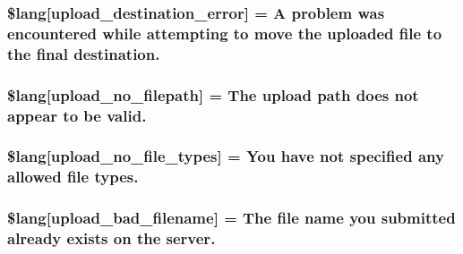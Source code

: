 \subsubsection[{\$lang}]{\setlength{\rightskip}{0pt plus 5cm}\$lang\mbox{[}\textquotesingle{}upload\+\_\+destination\+\_\+error\textquotesingle{}\mbox{]} = \textquotesingle{}A problem was encountered while attempting to move the uploaded file to the final destination.\textquotesingle{}}\label{system_2language_2english_2upload__lang_8php_a31be70c748b9bfc43dd7468e1fa64c42}
\hypertarget{system_2language_2english_2upload__lang_8php_a3c17908c53072c6a5ef593760aaaa704}{}
\subsubsection[{\$lang}]{\setlength{\rightskip}{0pt plus 5cm}\$lang\mbox{[}\textquotesingle{}upload\+\_\+no\+\_\+filepath\textquotesingle{}\mbox{]} = \textquotesingle{}The upload path does not appear to be valid.\textquotesingle{}}\label{system_2language_2english_2upload__lang_8php_a3c17908c53072c6a5ef593760aaaa704}
\hypertarget{system_2language_2english_2upload__lang_8php_ab188c98e583c81905dedaad54ad452bb}{}
\subsubsection[{\$lang}]{\setlength{\rightskip}{0pt plus 5cm}\$lang\mbox{[}\textquotesingle{}upload\+\_\+no\+\_\+file\+\_\+types\textquotesingle{}\mbox{]} = \textquotesingle{}You have not specified any allowed file types.\textquotesingle{}}\label{system_2language_2english_2upload__lang_8php_ab188c98e583c81905dedaad54ad452bb}
\hypertarget{system_2language_2english_2upload__lang_8php_abb379322384f3f35952a539c63e2c8f7}{}
\subsubsection[{\$lang}]{\setlength{\rightskip}{0pt plus 5cm}\$lang\mbox{[}\textquotesingle{}upload\+\_\+bad\+\_\+filename\textquotesingle{}\mbox{]} = \textquotesingle{}The file name you submitted already exists {\bf on} the server.\textquotesingle{}}\label{system_2language_2english_2upload__lang_8php_abb379322384f3f35952a539c63e2c8f7}
\hypertarget{system_2language_2english_2upload__lang_8php_aed6bfb5a9094179427f61fcbb582145b}{}
